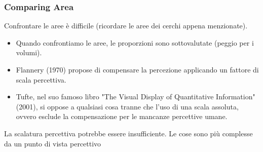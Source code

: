   \subsubsection{Comparing Area}
  Confrontare le aree è difficile (ricordare le aree dei cerchi appena menzionate).
    \begin{itemize}
        \item Quando confrontiamo le aree, le proporzioni sono sottovalutate (peggio per i volumi).
        \item Flannery (1970) propose di compensare la percezione applicando un fattore di scala percettiva.
        \item Tufte, nel suo famoso libro "The Visual Display of Quantitative Information" (2001), si oppose a qualsiasi cosa tranne che l'uso di una scala assoluta, ovvero esclude la compensazione per le mancanze percettive umane.
    \end{itemize}
    La scalatura percettiva potrebbe essere insufficiente. Le cose sono più complesse da un punto di vista percettivo
